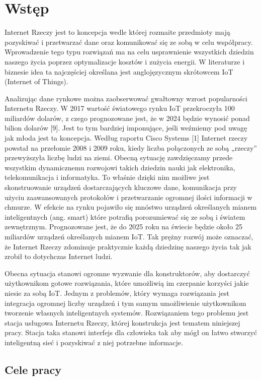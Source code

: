 \documentclass[12pt, twoside, openany]{mwrep}
\begin{document}
\chapter{Wstęp}
\par
Internet Rzeczy jest to koncepcja wedle której rozmaite przedmioty mają pozyskiwać i przetwarzać dane oraz komunikować się ze sobą w celu współpracy. Wprowadzenie tego typu rozwiązań ma na celu usprawnienie wszystkich dziedzin naszego życia poprzez optymalizacje kosztów i zużycia energii. W literaturze i biznesie idea ta najczęściej określana jest anglojęzycznym skrótowcem IoT (Internet of Things).
\par
Analizując dane rynkowe można zaobserwować gwałtowny wzrost popularności Internetu Rzeczy. W 2017 wartość światowego rynku IoT przekroczyła 100 miliardów dolarów, z czego prognozowane jest, że w 2024 będzie wynosić ponad bilion dolarów [9]. Jest to tym bardziej imponujące, jeśli weźmiemy pod uwagę jak młoda jest ta koncepcja. Według raportu Cisco Systems [1] Internet rzeczy powstał na przełomie 2008 i 2009 roku, kiedy liczba połączonych ze sobą „rzeczy” przewyższyła liczbę ludzi na ziemi.
Obecną sytuację zawdzięczamy przede wszystkim dynamicznemu rozwojowi takich dziedzin nauki jak elektronika, telekomunikacja i informatyka. To właśnie dzięki nim możliwe jest skonstruowanie urządzeń dostarczających kluczowe dane, komunikacja przy użyciu zaawansowanych protokołów i przetwarzanie ogromnej ilości informacji w chmurze. W efekcie na rynku pojawiło się mnóstwo urządzeń określanych mianem inteligentnych (ang. smart) które potrafią porozumiewać się ze sobą i światem zewnętrznym. Prognozowane jest, że do 2025 roku na świecie będzie około 25 miliardów urządzeń określanych mianem IoT. Tak prężny rozwój może oznaczać, że Internet Rzeczy zdominuje praktycznie każdą dziedzinę naszego życia tak jak zrobił to dotychczas Internet ludzi.
\par
Obecna sytuacja stanowi ogromne wyzwanie dla konstruktorów, aby dostarczyć użytkownikom gotowe rozwiązania, które umożliwią im czerpanie korzyści jakie niesie za sobą IoT. Jednym z problemów, który wymaga rozwiązania jest integracja ogromnej liczby urządzeń i tym samym umożliwienie użytkownikom tworzenie własnych inteligentnych systemów. Rozwiązaniem tego problemu jest stacja usługowa Internetu Rzeczy, której konstrukcja jest tematem niniejszej pracy. Stacja taka stanowi interfejs dla człowieka tak aby mógł on łatwo stworzyć inteligentną sieć i pozyskiwać z niej potrzebne informacje.
\par
\section{Cele pracy}
\end{document}
